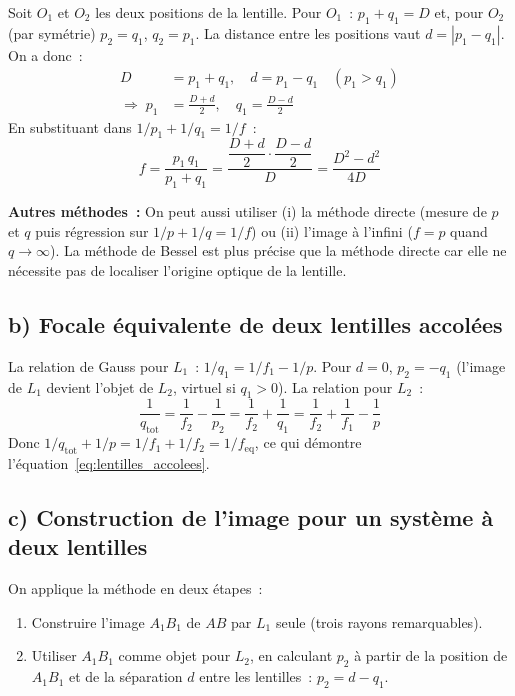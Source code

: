 ﻿\documentclass[a4paper, 11pt]{article}
\begin{document}
Soit $O_1$ et $O_2$ les deux positions de la lentille. Pour $O_1$~: $p_1 + q_1 = D$ et, pour $O_2$ (par symétrie) $p_2 = q_1$, $q_2 = p_1$. La distance entre les positions vaut $d = |p_1 - q_1|$. On a donc~:
\begin{align*}
  D &= p_1 + q_1, \quad d = p_1 - q_1 \quad (p_1 > q_1) \\
  \Rightarrow\; p_1 &= \frac{D+d}{2}, \quad q_1 = \frac{D-d}{2}
\end{align*}
En substituant dans $1/p_1 + 1/q_1 = 1/f$~:
\begin{equation*}
  f = \frac{p_1\,q_1}{p_1+q_1} = \frac{\dfrac{D+d}{2}\cdot\dfrac{D-d}{2}}{D} = \frac{D^2-d^2}{4D}
\end{equation*}

\textbf{Autres méthodes~:} On peut aussi utiliser (i) la méthode directe (mesure de $p$ et $q$ puis régression sur $1/p + 1/q = 1/f$) ou (ii) l'image à l'infini ($f = p$ quand $q \to \infty$). La méthode de Bessel est plus précise que la méthode directe car elle ne nécessite pas de localiser l'origine optique de la lentille.

\subsection*{b) Focale équivalente de deux lentilles accolées}

La relation de Gauss pour $L_1$~: $1/q_1 = 1/f_1 - 1/p$. Pour $d=0$, $p_2 = -q_1$ (l'image de $L_1$ devient l'objet de $L_2$, virtuel si $q_1 > 0$). La relation pour $L_2$~:
\begin{equation*}
  \frac{1}{q_\mathrm{tot}} = \frac{1}{f_2} - \frac{1}{p_2} = \frac{1}{f_2} + \frac{1}{q_1} = \frac{1}{f_2} + \frac{1}{f_1} - \frac{1}{p}
\end{equation*}
Donc $1/q_\mathrm{tot} + 1/p = 1/f_1 + 1/f_2 = 1/f_\mathrm{eq}$, ce qui démontre l'équation~\eqref{eq:lentilles_accolees}.

\subsection*{c) Construction de l'image pour un système à deux lentilles}

On applique la méthode en deux étapes~:
\begin{enumerate}
  \item Construire l'image $A_1B_1$ de $AB$ par $L_1$ seule (trois rayons remarquables).
  \item Utiliser $A_1B_1$ comme objet pour $L_2$, en calculant $p_2$ à partir de la position de $A_1B_1$ et de la séparation $d$ entre les lentilles~: $p_2 = d - q_1$.
\end{enumerate}
\end{document}
